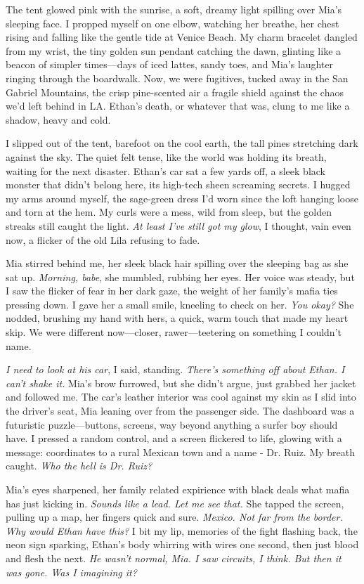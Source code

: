 \documentclass[12pt,oneside]{book} %
\begin{document}
The tent glowed pink with the sunrise, a soft, dreamy light spilling over Mia's sleeping face. I propped myself on one elbow, watching her breathe, her chest rising and falling like the gentle tide at Venice Beach. My charm bracelet dangled from my wrist, the tiny golden sun pendant catching the dawn, glinting like a beacon of simpler times—days of iced lattes, sandy toes, and Mia's laughter ringing through the boardwalk. Now, we were fugitives, tucked away in the San Gabriel Mountains, the crisp pine-scented air a fragile shield against the chaos we'd left behind in LA. Ethan's death, or whatever that was, clung to me like a shadow, heavy and cold.

I slipped out of the tent, barefoot on the cool earth, the tall pines stretching dark against the sky. The quiet felt tense, like the world was holding its breath, waiting for the next disaster. Ethan's car sat a few yards off, a sleek black monster that didn’t belong here, its high-tech sheen screaming secrets. I hugged my arms around myself, the sage-green dress I’d worn since the loft hanging loose and torn at the hem. My curls were a mess, wild from sleep, but the golden streaks still caught the light. \textit{At least I’ve still got my glow}, I thought, vain even now, a flicker of the old Lila refusing to fade.

Mia stirred behind me, her sleek black hair spilling over the sleeping bag as she sat up. \textit{Morning, babe}, she mumbled, rubbing her eyes. Her voice was steady, but I saw the flicker of fear in her dark gaze, the weight of her family’s mafia ties pressing down. I gave her a small smile, kneeling to check on her. \textit{You okay?} She nodded, brushing my hand with hers, a quick, warm touch that made my heart skip. We were different now—closer, rawer—teetering on something I couldn’t name.

\textit{I need to look at his car}, I said, standing. \textit{There’s something off about Ethan. I can’t shake it.} Mia’s brow furrowed, but she didn’t argue, just grabbed her jacket and followed me. The car’s leather interior was cool against my skin as I slid into the driver’s seat, Mia leaning over from the passenger side. The dashboard was a futuristic puzzle—buttons, screens, way beyond anything a surfer boy should have. I pressed a random control, and a screen flickered to life, glowing with a message: coordinates to a rural Mexican town and a name - \textnormal{Dr. Ruiz}. My breath caught. \textit{Who the hell is Dr. Ruiz?}

Mia’s eyes sharpened, her family related expirience with black deals what mafia has just kicking in. \textit{Sounds like a lead. Let me see that.} She tapped the screen, pulling up a map, her fingers quick and sure. \textit{Mexico. Not far from the border. Why would Ethan have this?} I bit my lip, memories of the fight flashing back, the neon sign sparking, Ethan’s body whirring with wires one second, then just blood and flesh the next. \textit{He wasn’t normal, Mia. I saw circuits, I think. But then it was gone. Was I imagining it?}
\end{document}
